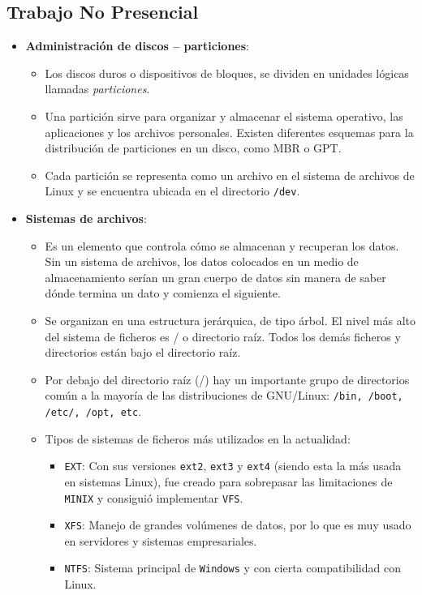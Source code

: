 \documentclass[10pt]{article}
\begin{document}
	\subsection{Trabajo No Presencial}
	\begin{itemize}
		\item \textbf{Administración de discos – particiones}: 
		\begin{itemize}
			\item Los discos duros o dispositivos de bloques, se dividen en unidades lógicas llamadas \textit{particiones}.\cite{Discos}
			\item Una partición sirve para organizar y almacenar el sistema operativo, las aplicaciones y los archivos personales. Existen diferentes esquemas para la distribución de particiones en un disco, como MBR o GPT.
			\item Cada partición se representa como un archivo en el sistema de archivos de Linux y se encuentra ubicada en el directorio \verb|/dev|.
		\end{itemize}
		\item \textbf{Sistemas de archivos}: 
		\begin{itemize}
			\item Es un elemento que controla cómo se almacenan y recuperan los datos. Sin un sistema de archivos, los datos colocados en un medio de almacenamiento serían un gran cuerpo de datos sin manera de saber dónde termina un dato y comienza el siguiente. 
			\item Se organizan en una estructura jerárquica, de tipo árbol. El nivel más alto del sistema de ficheros es / o directorio raíz. Todos los demás ficheros y directorios están bajo el directorio raíz.\cite{Archivos}
			\item Por debajo del directorio raíz (/) hay un importante grupo de directorios común a la mayoría de las distribuciones de GNU/Linux: \verb|/bin, /boot, /etc/, /opt, etc|.
			\item Tipos de sistemas de ficheros más utilizados en la actualidad:
			\begin{itemize}
				\item \verb|EXT|: Con sus versiones \verb|ext2|, \verb|ext3| y \verb|ext4| (siendo esta la más usada en sistemas Linux), fue creado para sobrepasar las limitaciones de \verb|MINIX| y consiguió implementar \verb|VFS|.
				\item \verb|XFS|: Manejo de grandes volúmenes de datos, por lo que es muy usado en servidores y sistemas empresariales.
				\item \verb|NTFS|: Sistema principal de \verb|Windows| y con cierta compatibilidad con Linux.

\end{itemize}
\end{itemize}
\end{itemize}
\end{document}
